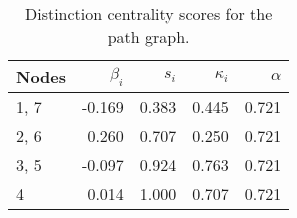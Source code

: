 \begin{table}
\centering
\caption{\label{tab:path}Distinction centrality scores for the path graph.}
\centering
\begin{tabular}[t]{lrrrr}
\toprule
Nodes & $\beta_i$ & $s_i$ & $\kappa_i$ & $\alpha$\\
\midrule
1, 7 & -0.169 & 0.383 & 0.445 & 0.721\\
2, 6 & 0.260 & 0.707 & 0.250 & 0.721\\
3, 5 & -0.097 & 0.924 & 0.763 & 0.721\\
4 & 0.014 & 1.000 & 0.707 & 0.721\\
\bottomrule
\end{tabular}
\end{table}
